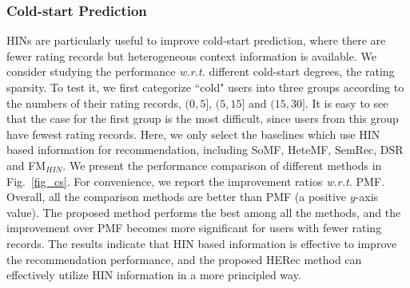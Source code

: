 \subsubsection{Cold-start Prediction}
HINs are particularly useful to improve cold-start prediction, where there are fewer rating records but heterogeneous context information is available. We consider studying the performance \emph{w.r.t.} different cold-start degrees, \ie the rating sparsity.
To test it, we first  categorize ``cold" users into three groups according to the numbers of their rating records, \ie $(0, 5]$, $(5, 15]$ and $(15, 30]$. It is easy to see that the case for the first group is the most difficult, since users from this group have fewest rating records.
Here, we only select the baselines which use HIN based information for recommendation, including SoMF, HeteMF, SemRec, DSR and FM$_{HIN}$.
We present the performance comparison of different methods in Fig.~\ref{fig_cs}. For convenience, we report the improvement ratios \emph{w.r.t.} PMF.
Overall, all the comparison methods are better than PMF (\ie a positive $y$-axis value). The proposed method performs the best among all the methods, and the improvement over PMF becomes more significant for users with fewer rating records. The results indicate that HIN based information is effective to improve the recommendation performance, and the proposed HERec method can effectively utilize HIN information in a more principled way.





